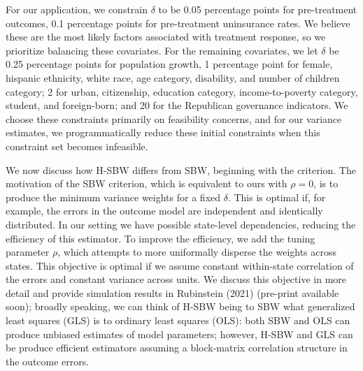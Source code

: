\documentclass[12pt]{article}
\begin{document}
For our application, we constrain $\delta$ to be 0.05 percentage points for pre-treatment outcomes, 0.1 percentage points for pre-treatment uninsurance rates. We believe these are the most likely factors associated with treatment response, so we prioritize balancing these covariates. For the remaining covariates, we let $\delta$ be 0.25 percentage points for population growth, 1 percentage point for female, hispanic ethnicity, white race, age category, disability, and number of children category; 2 for urban, citizenship, education category, income-to-poverty category, student, and foreign-born; and 20 for the Republican governance indicators. We choose these constraints primarily on feasibility concerns, and for our variance estimates, we programmatically reduce these initial constraints when this constraint set becomes infeasible.

We now discuss how H-SBW differs from SBW, beginning with the criterion. The motivation of the SBW criterion, which is equivalent to ours with $\rho = 0$, is to produce the minimum variance weights for a fixed $\delta$. This is optimal if, for example, the errors in the outcome model are independent and identically distributed. In our setting we have possible state-level dependencies, reducing the efficiency of this estimator. To improve the efficiency, we add the tuning parameter $\rho$, which attempts to more uniformally disperse the weights across states. This objective is optimal if we assume constant within-state correlation of the errors and constant variance across units. We discuss this objective in more detail and provide simulation results in Rubinstein (2021) (pre-print available soon); broadly speaking, we can think of H-SBW being to SBW what generalized least squares (GLS) is to ordinary least squares (OLS): both SBW and OLS can produce unbiased estimates of model parameters; however, H-SBW and GLS can be produce efficient estimators assuming a block-matrix correlation structure in the outcome errors. 
\end{document}
